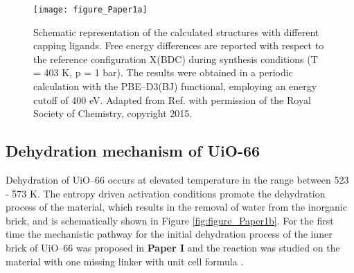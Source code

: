 \begin{figure}[ht]
	\centering
	\texttt{[image: figure\_Paper1a]}
	\caption[Schematic representation of the calculated structures with different
	capping ligands.]{Schematic representation of the calculated structures with different
	capping ligands. Free energy differences are reported with respect to
the reference configuration X(BDC) during synthesis conditions (T = 403 K,
p = 1 bar). The
results were obtained in a periodic calculation with the PBE--D3(BJ)
functional, employing an energy cutoff of 400 eV. Adapted from Ref.
\cite{Vandichel2015} with permission of the Royal Society of Chemistry, copyright 2015.}
	\label{fig:figure_Paper1a}
\end{figure}

\newpage
\subsection*{Dehydration mechanism of UiO-66}
Dehydration of UiO--66 occurs at elevated temperature in the range between 523
- 573 K.
The entropy driven activation conditions promote the dehydration process of the material, which results in the removal of water from the inorganic
brick, and is schematically shown in Figure \ref{fig:figure_Paper1b}. For the
first time the mechanistic pathway for the initial dehydration process of the
inner  brick of UiO--66 was proposed in \textbf{Paper I} and the reaction was studied on the material with one missing linker with unit cell formula 
\ce{[Zr6O4(OH)4(RCOO)12][Zr6O6(OH)2(RCOO)10]} \cite{Vandichel2015}.

